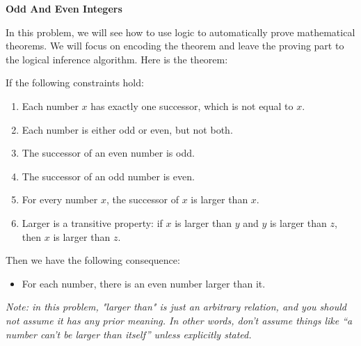 \item {\bf Odd And Even Integers}

In this problem, we will see how to use logic to automatically prove
mathematical theorems.  We will focus on encoding the theorem and leave the
proving part to the logical inference algorithm. Here is the theorem:

If the following constraints hold:
\begin{enumerate}[label=\arabic*., itemsep=0em]
   \item Each number $x$ has exactly one successor, which is not equal to $x$.
   \item Each number is either odd or even, but not both.
   \item The successor of an even number is odd.
   \item The successor of an odd number is even.
   \item For every number $x$, the successor of $x$ is larger than $x$.
   \item Larger is a transitive property: if $x$ is larger than $y$ and $y$ is
        larger than $z$, then $x$ is larger than $z$.
\end{enumerate}
Then we have the following consequence:
\begin{itemize}
  \item For each number, there is an even number larger than it.
\end{itemize}

{\em Note: in this problem, "larger than" is just an arbitrary relation, and you
should not assume it has any prior meaning.  In other words, don't assume things
like ``a number can't be larger than itself'' unless explicitly stated.}

\begin{enumerate}

  

  

\end{enumerate}
